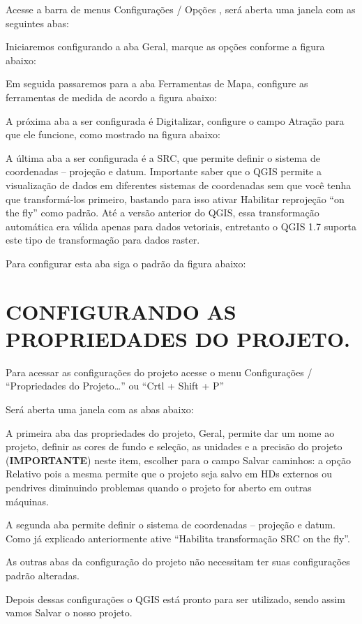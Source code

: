 \documentclass[
  11pt,
  a4paper,
]{book}
\begin{document}
Acesse a barra de menus Configurações / Opções , será aberta uma janela
com as seguintes abas:

Iniciaremos configurando a aba Geral, marque as opções conforme a figura
abaixo:

Em seguida passaremos para a aba Ferramentas de Mapa, configure as
ferramentas de medida de acordo a figura abaixo:

A próxima aba a ser configurada é Digitalizar, configure o campo Atração
para que ele funcione, como mostrado na figura abaixo:

A última aba a ser configurada é a SRC, que permite definir o sistema de
coordenadas -- projeção e datum. Importante saber que o QGIS permite a
visualização de dados em diferentes sistemas de coordenadas sem que você
tenha que transformá-los primeiro, bastando para isso ativar Habilitar
reprojeção ``on the fly'' como padrão. Até a versão anterior do QGIS,
essa transformação automática era válida apenas para dados vetoriais,
entretanto o QGIS 1.7 suporta este tipo de transformação para dados
raster.

Para configurar esta aba siga o padrão da figura abaixo:

\chapter{CONFIGURANDO AS PROPRIEDADES DO
PROJETO.}\label{configurando-as-propriedades-do-projeto.}

Para acessar as configurações do projeto acesse o menu Configurações /
``Propriedades do Projeto\ldots{}'' ou ``Crtl + Shift + P''

Será aberta uma janela com as abas abaixo:

A primeira aba das propriedades do projeto, Geral, permite dar um nome
ao projeto, definir as cores de fundo e seleção, as unidades e a
precisão do projeto (\textbf{IMPORTANTE}) neste item, escolher para o
campo Salvar caminhos: a opção Relativo pois a mesma permite que o
projeto seja salvo em HDs externos ou pendrives diminuindo problemas
quando o projeto for aberto em outras máquinas.

A segunda aba permite definir o sistema de coordenadas -- projeção e
datum. Como já explicado anteriormente ative ``Habilita transformação
SRC on the fly''.

As outras abas da configuração do projeto não necessitam ter suas
configurações padrão alteradas.

Depois dessas configurações o QGIS está pronto para ser utilizado, sendo
assim vamos Salvar o nosso projeto.
\end{document}
